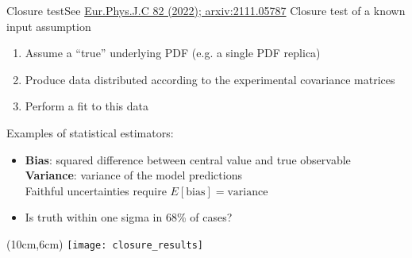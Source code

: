 \begin{frame}[t]{Closure test}{See \href{https://arxiv.org/pdf/2103.08606.pdf}{\color{blue}Eur.Phys.J.C 82 (2022); arxiv:2111.05787}}
    Closure test of a known input assumption
    \begin{enumerate}
        \item Assume a ``true'' underlying PDF (e.g. a single PDF replica)
        \item Produce data distributed according to the experimental covariance matrices
        \item Perform a fit to this data
    \end{enumerate}
    \vspace*{1em}
    Examples of statistical estimators:

    \begin{itemize}
        \item \textbf{Bias}: squared difference between central value and true observable\\
        \textbf{Variance}: variance of the model predictions\\
        Faithful uncertainties require $E[\textrm{bias}]=\textrm{variance}$
        \item Is truth within one sigma in 68\% of cases?
    \end{itemize}
    \vspace*{1em}
    \begin{textblock*}{\textwidth}(10cm,6cm) %
        \texttt{[image: closure\_results]}
    \end{textblock*}
\end{frame}


